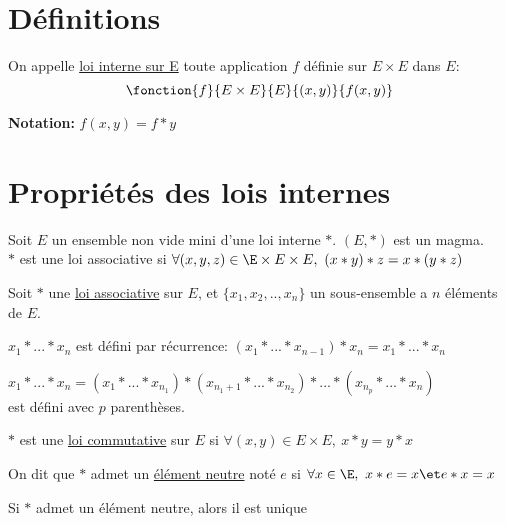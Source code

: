 \documentclass[12pt,twoside,a4paper]{article}
\author{MPSI 2}
\begin{document}
	\maketitle
	\section{D\'efinitions}
		\begin{defi}
			On appelle \underline{loi interne sur E} toute application $f$ d\'efinie sur $E\times E$ dans $E$:\\
			$$\fonction{f}{E\times E}{E}{(x,y)}{f(x,y)}$$
		\end{defi}
		\begin{flushleft}
			\textbf{Notation:} $f(x,y)=f*y$
		\end{flushleft}

	\section{Propri\'et\'es des lois internes}
		\begin{defi}
			Soit $E$ un ensemble non vide mini d'une loi interne $*$. $(E,*)$ est un magma.\\
			$*$ est une loi associative si $\forall (x,y,z)\in\E\times E\times E,\ (x*y)*z=x*(y*z)$
		\end{defi}
		\begin{prop}
			Soit $*$ une \underline{loi associative} sur $E$, et $\{x_1,x_2,..,x_n\}$ un sous-ensemble a $n$ \'el\'ements de $E$.
			\begin{liste}
				\item $x_1*...*x_n$ est d\'efini par r\'ecurrence: $(x_1*...*x_{n-1})*x_n=x_1*...*x_n$
				\item $x_1*...*x_n=(x_1*...*x_{n_1})*(x_{n_{1}+1}*...*x_{n_2})*...*(x_{n_p}*...*x_n)$\\est d\'efini avec $p$ parenth\`eses.
			\end{liste}
		\end{prop}
		\begin{defi}
			$*$ est une \underline{loi commutative} sur $E$ si $\forall (x,y)\in E\times E,\ x*y=y*x$
		\end{defi}
		\begin{defi}
			On dit que $*$ admet un \underline{\'el\'ement neutre} not\'e $e$ si $\forall x\in\E,\ x*e=x\et e*x=x$
		\end{defi}
		\begin{prop}
			Si $*$ admet un \'el\'ement neutre, alors il est unique
		\end{prop}
\end{document}
